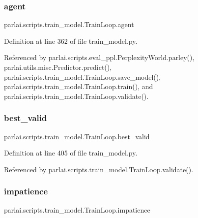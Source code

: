 \subsubsection{\texorpdfstring{agent}{agent}}
{\footnotesize\ttfamily parlai.\+scripts.\+train\+\_\+model.\+Train\+Loop.\+agent}



Definition at line 362 of file train\+\_\+model.\+py.



Referenced by parlai.\+scripts.\+eval\+\_\+ppl.\+Perplexity\+World.\+parley(), parlai.\+utils.\+misc.\+Predictor.\+predict(), parlai.\+scripts.\+train\+\_\+model.\+Train\+Loop.\+save\+\_\+model(), parlai.\+scripts.\+train\+\_\+model.\+Train\+Loop.\+train(), and parlai.\+scripts.\+train\+\_\+model.\+Train\+Loop.\+validate().

\mbox{\label{classparlai_1_1scripts_1_1train__model_1_1TrainLoop_a48a44b00d7b814ff20d0599803e92411}} 
\subsubsection{\texorpdfstring{best\+\_\+valid}{best\_valid}}
{\footnotesize\ttfamily parlai.\+scripts.\+train\+\_\+model.\+Train\+Loop.\+best\+\_\+valid}



Definition at line 405 of file train\+\_\+model.\+py.



Referenced by parlai.\+scripts.\+train\+\_\+model.\+Train\+Loop.\+validate().

\mbox{\label{classparlai_1_1scripts_1_1train__model_1_1TrainLoop_aeb16930507dc585a10096e2b235e2745}} 
\subsubsection{\texorpdfstring{impatience}{impatience}}
{\footnotesize\ttfamily parlai.\+scripts.\+train\+\_\+model.\+Train\+Loop.\+impatience}



